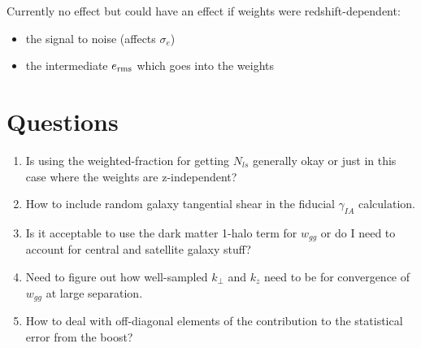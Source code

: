 \documentclass[onecolumn,amsmath,aps,fleqn, superscriptaddress]{revtex4}
\begin{document}
Currently no effect but could have an effect if weights were redshift-dependent:
\begin{itemize}
\item{the signal to noise (affects $\sigma_e$)}
\item{the intermediate $e_{\rm rms}$ which goes into the weights}
\end{itemize}

\section*{Questions}
\begin{enumerate}
\item{Is using the weighted-fraction for getting $N_{ls}$ generally okay or just in this case where the weights are z-independent? }
\item{How to include random galaxy tangential shear in the fiducial $\gamma_{IA}$ calculation.}
\item{Is it acceptable to use the dark matter 1-halo term for $w_{gg}$ or do I need to account for central and satellite galaxy stuff?}
\item{Need to figure out how well-sampled $k_\perp$ and $k_z$ need to be for convergence of $w_{gg}$ at large separation.}
\item{How to deal with off-diagonal elements of the contribution to the statistical error from the boost?}
\end{enumerate}


\end{document}
